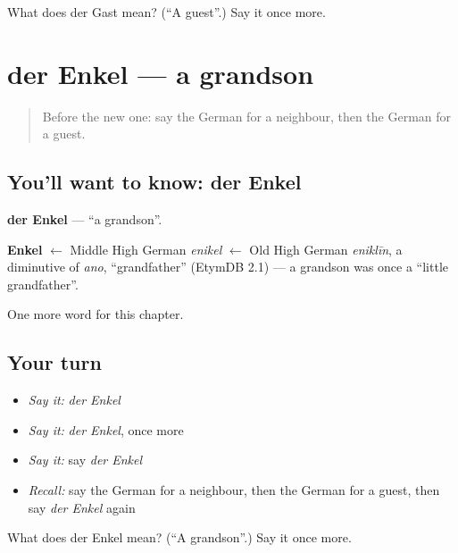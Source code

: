 \begin{tcolorbox}[breakable,colback=teal!4,colframe=teal!35!black,title={Before you move on}]
What does der Gast mean? (\textquotedblleft{}A guest\textquotedblright{}.) Say it once more.
\end{tcolorbox}
\section[der Enkel]{der Enkel — a grandson}

\label{lesson:GE-C63-enkel}



\begin{quote}
Before the new one: say the German for a neighbour, then the German for a guest.
\end{quote}

\subsection*{You'll want to know: der Enkel}
\textbf{der Enkel} — \textquotedblleft{}a grandson\textquotedblright{}.

\begin{cousinweb}
\textbf{Enkel} $\leftarrow$ Middle High German \emph{enikel} $\leftarrow$ Old High German \emph{eniklīn}, a diminutive of \emph{ano}, \textquotedblleft{}grandfather\textquotedblright{} (EtymDB 2.1) — a grandson was once a \textquotedblleft{}little grandfather\textquotedblright{}.
\end{cousinweb}

\begin{grammarlens}[title={What you've built}]
One more word for this chapter.
\end{grammarlens}

\subsection*{Your turn}
\begin{itemize}
\raggedright
  \item \emph{Say it:} \emph{der Enkel}
  \item \emph{Say it:} \emph{der Enkel}, once more
  \item \emph{Say it:} say \emph{der Enkel}
  \item \emph{Recall:} say the German for a neighbour, then the German for a guest, then say \emph{der Enkel} again
\end{itemize}

\begin{tcolorbox}[breakable,colback=teal!4,colframe=teal!35!black,title={Before you move on}]
What does der Enkel mean? (\textquotedblleft{}A grandson\textquotedblright{}.) Say it once more.
\end{tcolorbox}

